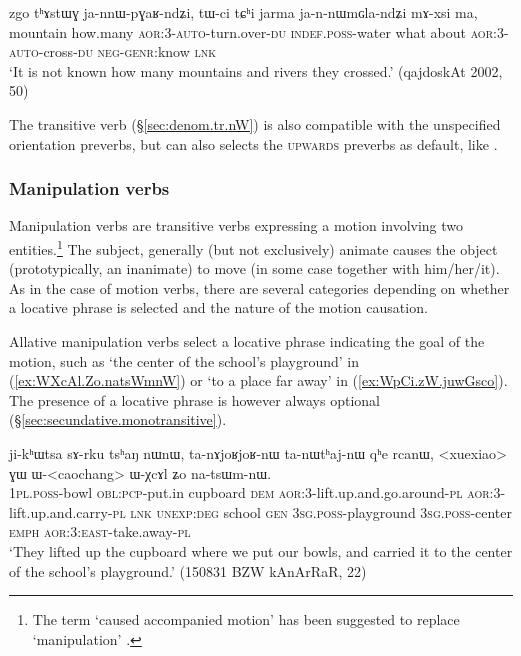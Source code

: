 \begin{exe}
\ex \label{ex:jannWpGaRndZi.jannWmGlandZi}
\gll  zgo tʰɤstɯɣ ja-nnɯ-pɣaʁ-ndʑi, tɯ-ci tɕʰi jarma ja-n-nɯmɢla-ndʑi mɤ-xsi ma, \\
 mountain how.many \textsc{aor}:3\flobv{}-\textsc{auto}-turn.over-\textsc{du} \textsc{indef}.\textsc{poss}-water what about \textsc{aor}:3\flobv{}-\textsc{auto}-cross-\textsc{du} \textsc{neg}-\textsc{genr}:know \textsc{lnk} \\
\glt `It is not known how many mountains and rivers they crossed.'  (qajdoskAt 2002, 50)
\end{exe}  

The transitive verb  (§\ref{sec:denom.tr.nW}) is also compatible with the unspecified orientation preverbs, but can also selects the \textsc{upwards} preverbs as default, like .

\subsubsection{Manipulation verbs} \label{sec:manipulation.verbs}
Manipulation verbs are transitive verbs expressing a motion involving two entities.\footnote{The term `caused accompanied motion' has been suggested to replace `manipulation' \citep{margetts19bring}. } The subject, generally (but not exclusively) animate causes the object (prototypically, an inanimate) to move (in some case together with him/her/it). As in the case of motion verbs, there are several categories depending on whether a locative phrase is selected and the nature of the motion causation.

Allative manipulation verbs select a locative phrase indicating the goal of the motion, such as  `the center of the school's playground' in (\ref{ex:WXcAl.Zo.natsWmnW}) or  `to a place far away' in (\ref{ex:WpCi.zW.juwGsco}). The presence of a locative phrase is however always optional (§\ref{sec:secundative.monotransitive}).

\begin{exe}
\ex \label{ex:WXcAl.Zo.natsWmnW}
\gll ji-kʰɯtsa sɤ-rku tsʰaŋ nɯnɯ, ta-nɤjoʁjoʁ-nɯ ta-nɯtʰaj-nɯ qʰe rcanɯ, <xuexiao> ɣɯ ɯ-<caochang> ɯ-χcɤl ʑo na-tsɯm-nɯ. \\
\textsc{1pl}.\textsc{poss}-bowl \textsc{obl}:\textsc{pcp}-put.in cupboard \textsc{dem} \textsc{aor}:3\flobv{}-lift.up.and.go.around-\textsc{pl} \textsc{aor}:3\flobv{}-lift.up.and.carry-\textsc{pl} \textsc{lnk} \textsc{unexp}:\textsc{deg} school \textsc{gen} \textsc{3sg}.\textsc{poss}-playground \textsc{3sg}.\textsc{poss}-center \textsc{emph} \textsc{aor}:3\flobv{}:\textsc{east}-take.away-\textsc{pl} \\
\glt `They lifted up the cupboard where we put our bowls, and carried it to the center of the school's playground.' (150831 BZW kAnArRaR, 22)
\end{exe} 

